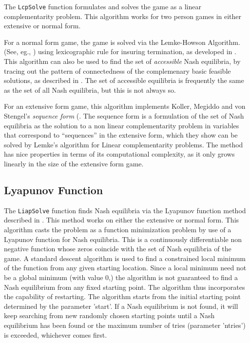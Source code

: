 The {\tt LcpSolve} function formulates and solves the game as a linear
complementarity problem.  This algorithm works for two person
games in either extensive or normal form.  
 
For a normal form game, the game is solved via the Lemke-Howson
Algorithm.  (See, eg.,
\cite{LemHow:64}) using lexicographic rule for insuring
termination, as developed in \cite{Eav:71}.  This algorithm can also
be used to find the set of {\em accessible} Nash equilibria, by
tracing out the pattern of connectedness of the complemenary basic
feasible solutions, as described in \cite{Sha:74}.  The set of
accessible equilibria is frequently the same as the set of all Nash
equilibria, but this is not always so.

For an extensive form game, this algorithm implements Koller, Megiddo
and von Stengel's {\em sequence form} (\cite{KolMegSte:94}. The
sequence form is a formulation of the set of Nash equilibria as the
solution to a non linear complementarity problem in variables that
correspond to ``sequences'' in the extensive form, which they show can
be solved by Lemke's algorithm for Linear complementarity problems.
The method has nice properties in terms of its computational
complexity, as it only grows linearly in the size of the extensive
form game.  

\subsection{Lyapunov Function}

The {\tt LiapSolve} function finds Nash equilibria via the Lyapunov
function method described in \cite{McK:91}.  This method works on
either the extensive or normal form.  This algorithm casts the problem
as a function minimization problem by use of a Lyapunov function for
Nash equilibria.  This is a continuously differentiable non negative
function whose zeros coincide with the set of Nash equilibria of the
game.  A standard descent algorithm is used to find a constrained
local minimum of the function from any given starting location.  Since
a local minimum need not be a global minimum (with value 0,) the
algorithm is not guaranteed to find a Nash equilibrium from any fixed
starting point.  The algorithm thus incorporates the capability of
restarting.  The algorithm starts from the initial starting point
determined by the parameter 'start'.  If a Nash equilibrium is not
found, it will keep searching from new randomly chosen starting points
until a Nash equilibrium has been found or the maximum number of tries
(parameter 'ntries') is exceeded, whichever comes first.

